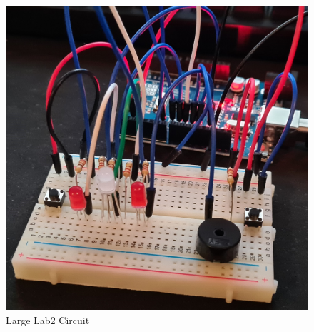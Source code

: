 \documentclass[journal]{IEEEtran}
\begin{document}
\begin{figure}[h]
    \begin {center}
    \includegraphics[width=\textwidth]{images/circuit-picture.jpg}
    \caption{Large Lab2 Circuit}
    \label{fig:circuitPictureLarge}
    \end {center}
\end{figure}
\end{document}
